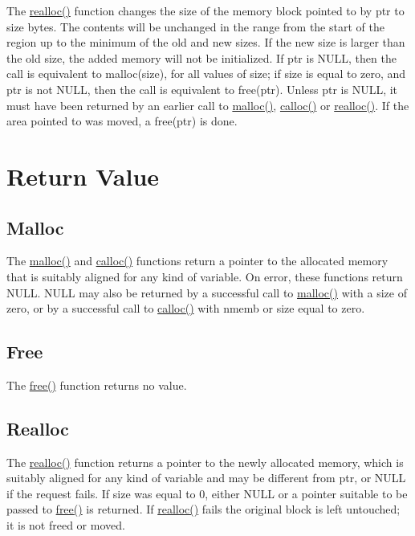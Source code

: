 The \hyperlink{realloc_8c_a1a6b5e8d2f1c37e5b43e4345586075be}{realloc()} function changes the size of the memory block pointed to by ptr to size bytes. The contents will be unchanged in the range from the start of the region up to the minimum of the old and new sizes. If the new size is larger than the old size, the added memory will not be initialized. If ptr is N\+U\+LL, then the call is equivalent to malloc(size), for all values of size; if size is equal to zero, and ptr is not N\+U\+LL, then the call is equivalent to free(ptr). Unless ptr is N\+U\+LL, it must have been returned by an earlier call to \hyperlink{malloc_8c_a7ac38fce3243a7dcf448301ee9ffd392}{malloc()}, \hyperlink{calloc_8c_a62b7798461bd461da64c5f9d35feddf7}{calloc()} or \hyperlink{realloc_8c_a1a6b5e8d2f1c37e5b43e4345586075be}{realloc()}. If the area pointed to was moved, a free(ptr) is done.\hypertarget{index_ret_sec}{}\section{Return Value}\label{index_ret_sec}
\hypertarget{index_malloc}{}\subsection{Malloc}\label{index_malloc}
The \hyperlink{malloc_8c_a7ac38fce3243a7dcf448301ee9ffd392}{malloc()} and \hyperlink{calloc_8c_a62b7798461bd461da64c5f9d35feddf7}{calloc()} functions return a pointer to the allocated memory that is suitably aligned for any kind of variable. On error, these functions return N\+U\+LL. N\+U\+LL may also be returned by a successful call to \hyperlink{malloc_8c_a7ac38fce3243a7dcf448301ee9ffd392}{malloc()} with a size of zero, or by a successful call to \hyperlink{calloc_8c_a62b7798461bd461da64c5f9d35feddf7}{calloc()} with nmemb or size equal to zero.\hypertarget{index_free}{}\subsection{Free}\label{index_free}
The \hyperlink{free_8c_ac27a03e54e8a0e720ad2cfb00cdc7511}{free()} function returns no value.\hypertarget{index_realloc}{}\subsection{Realloc}\label{index_realloc}
The \hyperlink{realloc_8c_a1a6b5e8d2f1c37e5b43e4345586075be}{realloc()} function returns a pointer to the newly allocated memory, which is suitably aligned for any kind of variable and may be different from ptr, or N\+U\+LL if the request fails. If size was equal to 0, either N\+U\+LL or a pointer suitable to be passed to \hyperlink{free_8c_ac27a03e54e8a0e720ad2cfb00cdc7511}{free()} is returned. If \hyperlink{realloc_8c_a1a6b5e8d2f1c37e5b43e4345586075be}{realloc()} fails the original block is left untouched; it is not freed or moved. 